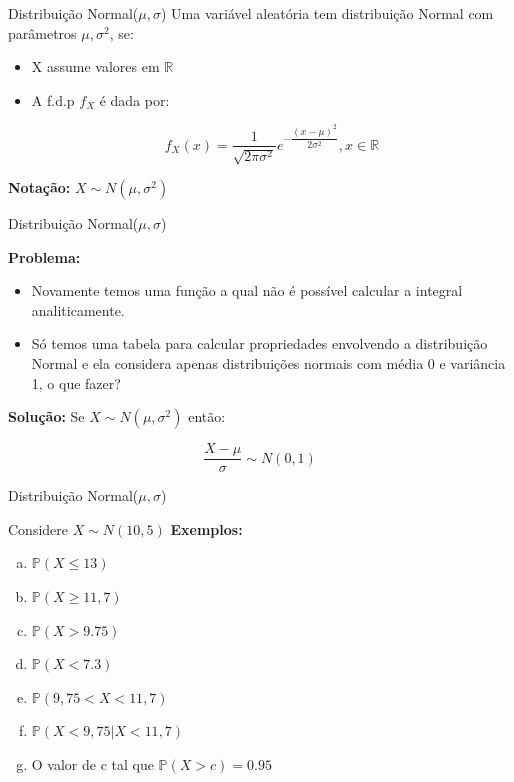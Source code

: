 \begin{frame}{Distribuição Normal($\mu, \sigma$)}
    Uma variável aleatória tem distribuição Normal com parâmetros $\mu, \sigma^2$, se:

    \begin{itemize}
        \item X assume valores em $\mathbb{R}$
        \item A f.d.p $f_X$ é dada por:

        $$f_X(x) =\dfrac{1}{\sqrt{2\pi\sigma^2}} e^{-\dfrac{(x-\mu)^2}{2\sigma^2}}, x \in \mathbb{R}$$
    \end{itemize}

    \textbf{Notação:} $X \sim N(\mu, \sigma^2)$
\end{frame}

\begin{frame}{Distribuição Normal($\mu, \sigma$)}


\textbf{Problema:} 

\begin{itemize}
\item Novamente temos uma função a qual não é possível calcular a integral analiticamente. 
    \item Só temos uma tabela para calcular propriedades envolvendo a distribuição Normal e ela considera apenas distribuições normais com média 0 e variância 1, o que fazer?
\end{itemize}
\pause
\textbf{Solução:}
    Se $X \sim N(\mu, \sigma^2)$ então:

    $$\dfrac{X - \mu}{\sigma} \sim N(0,1)$$
\end{frame}

\begin{frame}{Distribuição Normal($\mu, \sigma$)}

Considere $X \sim N(10, 5)$
    \textbf{Exemplos:}
    \begin{enumerate}[a)]
        \item $\mathds{P}(X \leq 13)$
        \item $\mathds{P}(X \geq 11,7)$
        \item $\mathds{P}(X > 9.75)$
        \item $\mathds{P}(X < 7.3)$
        \item $\mathds{P}(9,75 <X < 11,7)$
        \item $\mathds{P}(X < 9,75| X < 11,7)$
        \item O valor de c tal que $\mathds{P}(X > c) = 0.95$
    \end{enumerate}
\end{frame}

